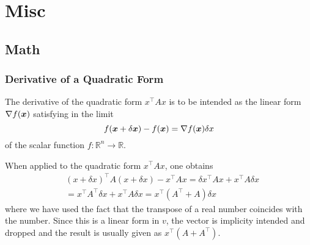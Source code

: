 \chapter{Misc}


\section{Math}

\subsection{Derivative of a Quadratic Form}
\label{sec:derivative-quadratic-form}

The derivative of the quadratic form $x^\top A x$ is to be intended as the linear form $\nabla f(\boldsymbol{x})$ satisfying in the limit
\begin{equation*}
  f(\boldsymbol{x}+\delta\boldsymbol{x}) - f(\boldsymbol{x}) = \nabla f(\boldsymbol{x}) \delta x
\end{equation*}
of the scalar function $f:\mathbb{R}^n\rightarrow \mathbb{R}$.

When applied to the quadratic form $x^\top A x$, one obtains
\begin{equation}
  \label{eq:derivative-quadratic-form}
  \begin{aligned}
    & (x+\delta x)^\top A(x+\delta x) - x^\top Ax = \delta x^\top Ax + x^\top A\delta x \\
    &= x^\top A^\top \delta x + x^\top A\delta x = x^\top\left(A^\top + A\right)\delta x
  \end{aligned}
\end{equation}
where we have used the fact that the transpose of a real number coincides with the number.
Since this is a linear form in $v$, the vector is implicity intended and dropped and the result is usually given as $x^\top\left(A + A^\top\right)$.




